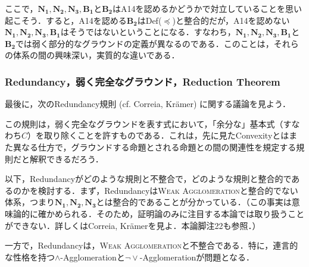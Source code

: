 \documentclass[twoside,14Q,dvipdfmx]{jsarticle}
\theoremstyle{definition}
\begin{document}
ここで，$\mathbf{N_{1}, N_{2}, N_{3}, B_{1}}$と$\mathbf{B_{2}}$はA14を認めるかどうかで対立していることを思い起こそう．すると，A14を認める$\mathbf{B_{2}}$はDef($\preceq$)と整合的だが，A14を認めない$\mathbf{N_{1}, N_{2}, N_{3}, B_{1}}$はそうではないということになる．すなわち，$\mathbf{N_{1}, N_{2}, N_{3}, B_{1}}$と$\mathbf{B_{2}}$では弱く部分的なグラウンドの定義が異なるのである．このことは，それらの体系の間の興味深い，実質的な違いである．
%
%
%
\subsubsection{Redundancy，弱く完全なグラウンド，Reduction Theorem}\label{redundancy}
最後に，次のRedundancy規則 (cf. Correia\cite{Correia2017}, Kr\"{a}mer\cite{Kramer2018,Kramer2021}) に関する議論を見よう．

\begin{prooftree}
\end{prooftree}

\noindent この規則は，弱く完全なグラウンドを表す式において，「余分な」基本式（すなわち$C$）を取り除くことを許すものである．これは，先に見たConvexityとはまた異なる仕方で，グラウンドする命題とされる命題との間の関連性を規定する規則だと解釈できるだろう．

以下，Redundancyがどのような規則と不整合で，どのような規則と整合的であるのかを検討する．まず，Redundancyは\textsc{Weak Agglomeration}と整合的でない体系，つまり$\mathbf{N_{1}}, \mathbf{N_{2}}, \mathbf{N_{3}}$とは整合的であることが分かっている．（この事実は意味論的に確かめられる．そのため，証明論のみに注目する本論では取り扱うことができない．詳しくはCorreia\cite[p.525]{Correia2017}, Kr\"{a}mer\cite[p.1671]{Kramer2021}を見よ．本論脚注22も参照．）

一方で，Redundancyは，\textsc{Weak Agglomeration}と不整合である．特に，連言的な性格を持つ$\land$-Agglomerationと$\lnot\lor$-Agglomerationが問題となる．
\end{document}
